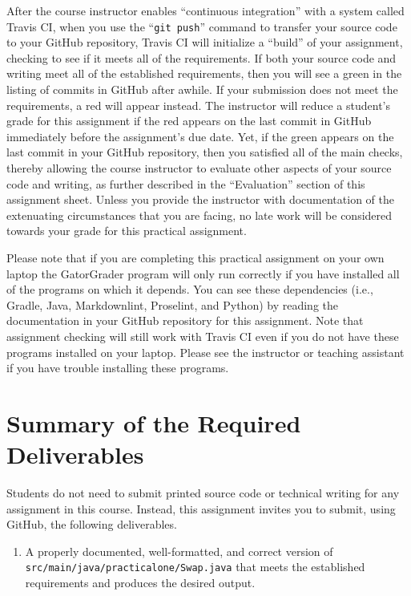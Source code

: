 \documentclass[11pt]{article}
\newcommand{\mainprogramsource}{\lstinline{src/main/java/practicalone/Swap.java}}
\newcommand{\gitpush}{\command{git push}}
\newcommand{\command}[1]{``\lstinline{#1}''}
\newcommand{\step}[1]{``{#1}''}
\newcommand{\checkmark}{\ding{51}}
\newcommand{\naughtmark}{\ding{55}}
\begin{document}
After the course instructor enables \step{continuous integration} with a system called Travis CI, when you use the
\gitpush{} command to transfer your source code to your GitHub repository, Travis CI will initialize a \step{build} of
your assignment, checking to see if it meets all of the requirements. If both your source code and writing meet all of
the established requirements, then you will see a green \checkmark{} in the listing of commits in GitHub after awhile.
If your submission does not meet the requirements, a red \naughtmark{} will appear instead. The instructor will reduce a
student's grade for this assignment if the red \naughtmark{} appears on the last commit in GitHub immediately before the
assignment's due date. Yet, if the green \checkmark{} appears on the last commit in your GitHub repository, then you
satisfied all of the main checks, thereby allowing the course instructor to evaluate other aspects of your source code
and writing, as further described in the \step{Evaluation} section of this assignment sheet. Unless you provide the
instructor with documentation of the extenuating circumstances that you are facing, no late work will be considered
towards your grade for this practical assignment.

Please note that if you are completing this practical assignment on your own laptop the GatorGrader program will only
run correctly if you have installed all of the programs on which it depends. You can see these dependencies (i.e.,
Gradle, Java, Markdownlint, Proselint, and Python) by reading the documentation in your GitHub repository for this
assignment. Note that assignment checking will still work with Travis CI even if you do not have these programs
installed on your laptop. Please see the instructor or teaching assistant if you have trouble installing these programs.

\section*{Summary of the Required Deliverables}

\noindent Students do not need to submit printed source code or technical writing for any assignment in this course.
Instead, this assignment invites you to submit, using GitHub, the following deliverables.

\begin{enumerate}

  \setlength{\itemsep}{0in}

\item A properly documented, well-formatted, and correct version of
  \mainprogramsource{} that meets the established requirements and produces the
  desired output.

\end{enumerate}
\end{document}
